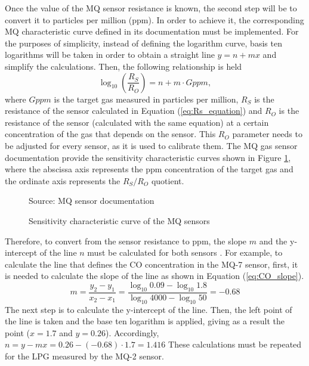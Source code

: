 Once the value of the MQ sensor resistance is known, the second step will be to convert it to particles per million (ppm). In order to achieve it, the corresponding MQ characteristic curve defined in its documentation must be implemented. For the purposes of simplicity, instead of defining the logarithm curve, basis ten logarithms will be taken in order to obtain a straight line $y=n+mx$ and simplify the calculations. Then, the following relationship is held
\begin{equation*} \label{eq:ppm_equation}
\log _{ 10 }{ \left( \frac{{R}_{S}}{{R}_{O}} \right)} =n+m\cdot Gppm,
\end{equation*}
where $Gppm$ is the target gas measured in particles per million, ${R}_{S}$ is the resistance of the sensor calculated in Equation (\ref{eq:Rs_equation}) and ${R}_{O}$ is the resistance of the sensor (calculated with the same equation) at a certain concentration of the gas that depends on the sensor. This ${R}_{O}$ parameter needs to be adjusted for every sensor, as it is used to calibrate them. The MQ gas sensor documentation provide the sensitivity characteristic curves shown in Figure \ref{fig:6-MQ_curve}, where the abscissa axis represents the ppm concentration of the target gas and the ordinate axis represents the ${R}_{S}/{R}_{O}$ quotient.

\begin{figure}[htb]
	\centering
	\caption{Sensitivity characteristic curve of the MQ sensors}
	\label{fig:6-MQ_curve}{Source: MQ sensor documentation \cite{MQ7,MQ2}}
\end{figure}

Therefore, to convert from the sensor resistance to ppm, the slope $m$ and the y-intercept of the line $n$ must be calculated for both sensors \cite{ConfMQX}. For example, to calculate the line that defines the CO concentration in the MQ-7 sensor, first, it is needed to calculate the slope of the line as shown in Equation (\ref{eq:CO_slope}).
\begin{equation} \label{eq:CO_slope}
m=\frac { { y }_{ 2 }-{ y }_{ 1 } }{ { x }_{ 2 }-{ x }_{ 1 } } =\frac { \log _{ 10 }{ 0.09 } -\log _{ 10 }{ 1.8 }  }{ \log _{ 10 }{ 4000 } -\log _{ 10 }{ 50 }  } =-0.68
\end{equation}
The next step is to calculate the y-intercept of the line. Then, the left point of the line is taken and the base ten logarithm is applied, giving as a result the point ($x=1.7$ and $y=0.26$). Accordingly, $n = y - mx =  0.26 - (-0.68)\cdot1.7 = 1.416$ These calculations must be repeated for the LPG measured by the MQ-2 sensor.

